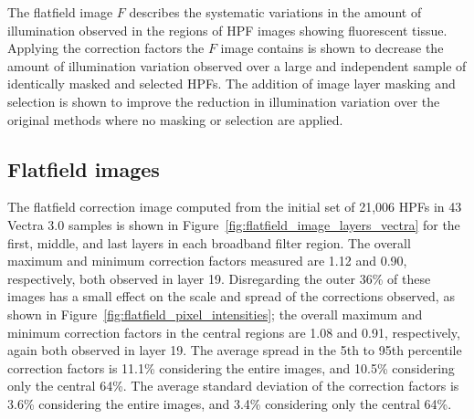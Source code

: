 \documentclass[letterpaper,11pt]{article}
\newcommand{\reffig}[1]{Figure~\ref{#1}}
\begin{document}
The flatfield image $F$ describes the systematic variations in the amount of illumination observed in the regions of HPF images showing fluorescent tissue. Applying the correction factors the $F$ image contains is shown to decrease the amount of illumination variation observed over a large and independent sample of identically masked and selected HPFs. The addition of image layer masking and selection is shown to improve the reduction in illumination variation over the original methods where no masking or selection are applied.

\subsection{Flatfield images}
\label{ssec:flatfield_images}

The flatfield correction image computed from the initial set of 21,006 HPFs in 43 Vectra 3.0 samples is shown in \reffig{fig:flatfield_image_layers_vectra} for the first, middle, and last layers in each broadband filter region. The overall maximum and minimum correction factors measured are 1.12 and 0.90, respectively, both observed in layer 19. Disregarding the outer 36\% of these images has a small effect on the scale and spread of the corrections observed, as shown in \reffig{fig:flatfield_pixel_intensities}; the overall maximum and minimum correction factors in the central regions are 1.08 and 0.91, respectively, again both observed in layer 19. The average spread in the 5th to 95th percentile correction factors is 11.1\% considering the entire images, and 10.5\% considering only the central 64\%. The average standard deviation of the correction factors is 3.6\% considering the entire images, and 3.4\% considering only the central 64\%. 
\end{document}
